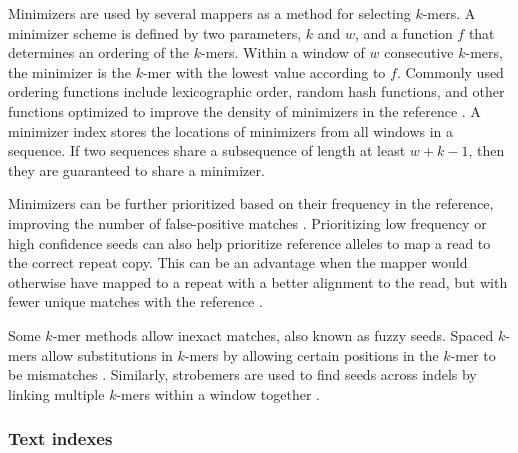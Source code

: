 \documentclass[11pt]{ucscthesis}
\begin{document}
Minimizers are used by several mappers as a method for selecting $k$-mers.
A minimizer scheme is defined by two parameters, $k$ and $w$, and a function $f$ that determines an ordering of the $k$-mers.
Within a window of $w$ consecutive $k$-mers, the minimizer is the $k$-mer with the lowest value according to $f$.
Commonly used ordering functions include lexicographic order, random hash functions, and other functions optimized to improve the density of minimizers in the reference \cite{zheng_minimizers_2020,marcais_minimizers_2018}.
A minimizer index stores the locations of minimizers from all windows in a sequence.
If two sequences share a subsequence of length at least $w+k-1$, then they are guaranteed to share a minimizer.

Minimizers can be further prioritized based on their frequency in the reference, improving the number of false-positive matches \cite{jain_winnowmap_2020}.
Prioritizing low frequency or high confidence seeds can also help prioritize reference alleles to map a read to the correct repeat copy. 
This can be an advantage when the mapper would otherwise have mapped to a repeat with a better alignment to the read, but with fewer unique matches with the reference \cite{winnowmap2_2022}.

Some $k$-mer methods allow inexact matches, also known as fuzzy seeds.
Spaced $k$-mers allow substitutions in $k$-mers by allowing certain positions in the $k$-mer to be mismatches \cite{ma_patternhunter_2002}.
Similarly, strobemers are used to find seeds across indels by linking multiple $k$-mers within a window together \cite{sahlin_strobemers_2021}.



\subsubsection{Text indexes}
\end{document}
